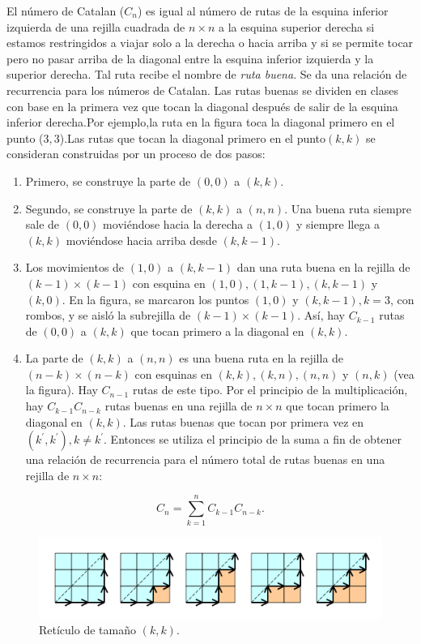 \begin{example}
	El número de Catalan ($C_{n} $) es igual al número de rutas de la esquina inferior izquierda de una rejilla cuadrada de $n\times n$ a la esquina superior derecha si estamos restringidos a viajar solo a la derecha o hacia arriba y si se permite tocar pero no pasar arriba de la diagonal entre la esquina inferior izquierda y la superior derecha. Tal ruta recibe el nombre de \emph{ruta buena}. Se da una relación de recurrencia para los números de Catalan. Las rutas buenas se dividen en clases con base en  la primera vez que tocan la diagonal después de salir de la esquina inferior derecha.Por ejemplo,la ruta en la figura toca la diagonal primero en el punto ($3,3$).Las rutas que tocan la diagonal primero en el punto$(k,k)$ se consideran construidas por un proceso de dos pasos:
	\begin{enumerate}
		\item Primero, se construye la parte de $(0,0)$ a $(k,k)$.
		\item Segundo, se construye la parte de $(k,k)$ a $(n,n)$. Una buena ruta siempre sale de $(0,0)$ moviéndose hacia la derecha a $(1,0)$ y siempre llega a $(k,k)$ moviéndose hacia arriba desde $(k,k-1)$.
		\item Los movimientos de $(1,0)$ a $(k,k-1)$ dan una ruta buena en la rejilla de $(k-1)\times(k-1) $ con esquina en $ (1,0),(1,k-1),(k,k-1)$ y $ (k,0)$. En la figura, se marcaron los puntos $(1,0)$ y $(k,k-1),k=3$, con rombos, y se aisló la subrejilla de $(k-1)\times(k-1)$. Así, hay $C_{k-1}$ rutas de $(0,0)$ a $(k,k)$ que tocan primero a la diagonal en $(k,k)$.
		\item La parte de $(k,k)$ a $(n,n)$ es una buena ruta en la rejilla de $(n-k)\times(n-k)$ con esquinas en $(k,k),(k,n),(n,n)$ y $(n,k)$ (vea la figura). Hay $C_{n-1}$ rutas de este tipo. Por el principio de la multiplicación, hay $C_{k-1}C_{n-k}$ rutas buenas en una rejilla de $n\times n$ que tocan primero la diagonal en $(k,k)$. Las rutas buenas que tocan por primera vez en $(k^{\prime}, k^{\prime}),k\neq k^{\prime}$. Entonces se utiliza el principio de la suma a fin de obtener una relación de recurrencia para el número total de rutas buenas en una rejilla de $n\times n$:
	\end{enumerate}
	\[ C_{n}=\sum_{k=1}^{n}C_{k-1}C_{n-k}. \]
	\begin{figure}[ht!]
		\sidecaption[t]%
		\centering
		\includegraphics[width=0.4\paperwidth]{./img/catalan}
		\caption{\label{fig:catalan} Retículo de tamaño $\left(k,k\right)$.}
	\end{figure}
\end{example}

